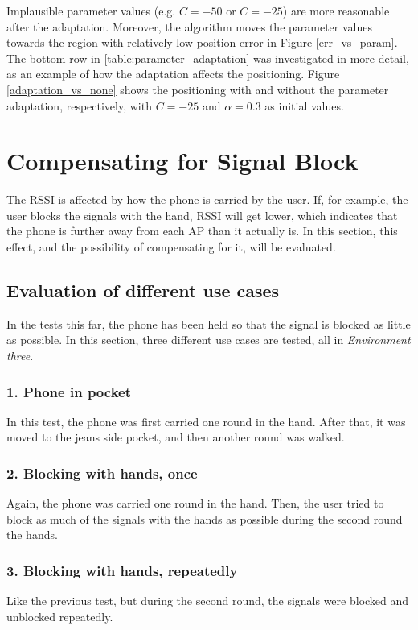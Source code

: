 \documentclass{LTHthesis}
\begin{document}
Implausible parameter values (e.g. $C = -50$ or $C = -25$) are more reasonable after the adaptation. Moreover, the algorithm moves the parameter values towards the region with relatively low position error in Figure \ref{err_vs_param}. The bottom row in \ref{table:parameter_adaptation} was investigated in more detail, as an example of how the adaptation affects the positioning. Figure \ref{adaptation_vs_none} shows the positioning with and without the parameter adaptation, respectively, with $C = -25$ and $\alpha = 0.3$ as initial values.

\section{Compensating for Signal Block} %
%

The RSSI is affected by how the phone is carried by the user. If, for example, the user blocks the signals with the hand, RSSI will get lower, which indicates that the phone is further away from each AP than it actually is. In this section, this effect, and the possibility of compensating for it, will be evaluated.

\subsection{Evaluation of different use cases}
In the tests this far, the phone has been held so that the signal is blocked as little as possible. In this section, three different use cases are tested, all in \emph{Environment three}. 

\subsubsection{1. Phone in pocket}
In this test, the phone was first carried one round in the hand. After that, it was moved to the jeans side pocket, and then another round was walked.

\subsubsection{2. Blocking with hands, once}
Again, the phone was carried one round in the hand. Then, the user tried to block as much of the signals with the hands as possible during the second round the hands.

\subsubsection{3. Blocking with hands, repeatedly}
Like the previous test, but during the second round, the signals were blocked and unblocked repeatedly. 
\end{document}
